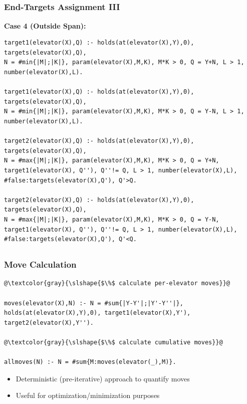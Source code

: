 \documentclass{beamer}
\begin{document}
\subsection{}
\begin{frame}[fragile]
\frametitle{End-Targets Assignment III}
\begin{adjustwidth}{-1em}{-1em}
\textbf{Case 4 (Outside Span):}
\vspace{5pt}
\begin{lstlisting}[basicstyle=\scriptsize\ttfamily]
target1(elevator(X),Q) :- holds(at(elevator(X),Y),0), targets(elevator(X),Q), 
N = #min{|M|;|K|}, param(elevator(X),M,K), M*K > 0, Q = Y+N, L > 1,
number(elevator(X),L).

target1(elevator(X),Q) :- holds(at(elevator(X),Y),0), targets(elevator(X),Q), 
N = #min{|M|;|K|}, param(elevator(X),M,K), M*K > 0, Q = Y-N, L > 1,
number(elevator(X),L).

target2(elevator(X),Q) :- holds(at(elevator(X),Y),0), targets(elevator(X),Q), 
N = #max{|M|;|K|}, param(elevator(X),M,K), M*K > 0, Q = Y+N, 
target1(elevator(X), Q''), Q''!= Q, L > 1, number(elevator(X),L), 
#false:targets(elevator(X),Q'), Q'>Q.

target2(elevator(X),Q) :- holds(at(elevator(X),Y),0), targets(elevator(X),Q), 
N = #max{|M|;|K|}, param(elevator(X),M,K), M*K > 0, Q = Y-N,
target1(elevator(X), Q''), Q''!= Q, L > 1, number(elevator(X),L), 
#false:targets(elevator(X),Q'), Q'<Q.
\end{lstlisting}
\end{adjustwidth}
\end{frame}

\subsection{}
\begin{frame}[fragile]
\frametitle{Move Calculation}
\begin{adjustwidth}{-1em}{-1em}
\begin{lstlisting}
@\textcolor{gray}{\slshape{$\%$ calculate per-elevator moves}}@

moves(elevator(X),N) :- N = #sum{|Y-Y'|;|Y'-Y''|}, 
holds(at(elevator(X),Y),0), target1(elevator(X),Y'), 
target2(elevator(X),Y'').

@\textcolor{gray}{\slshape{$\%$ calculate cumulative moves}}@

allmoves(N) :- N = #sum{M:moves(elevator(_),M)}.
\end{lstlisting}
\begin{itemize}
    \setlength\itemsep{1em}
    \item Deterministic (pre-iterative) approach to quantify moves
    \item Useful for optimization/minimization purposes
\end{itemize}
\end{adjustwidth}
\end{frame}
\end{document}
